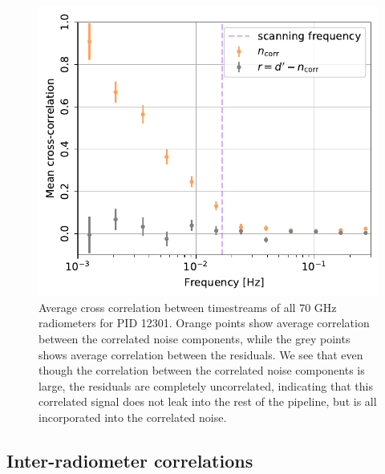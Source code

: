 \documentclass[twocolumn]{aa}
\begin{document}
\begin{figure}
	\begin{center}
		\includegraphics[width=\linewidth]{figs/mean_crosscorr_070_12301.pdf}
	\end{center}
	\caption{Average cross correlation between timestreams of all 70 GHz
    radiometers for PID 12301. Orange points show average correlation between
    the correlated noise components, while the grey points shows average
    correlation between the residuals. We see that even though the correlation
    between the correlated noise components is large, the residuals are completely uncorrelated, indicating that this correlated signal does not leak into the rest of the pipeline, but is all incorporated into the correlated noise.
		\label{fig:mean_xcorr_70}}
\end{figure}

\subsection{Inter-radiometer correlations}
\end{document}
